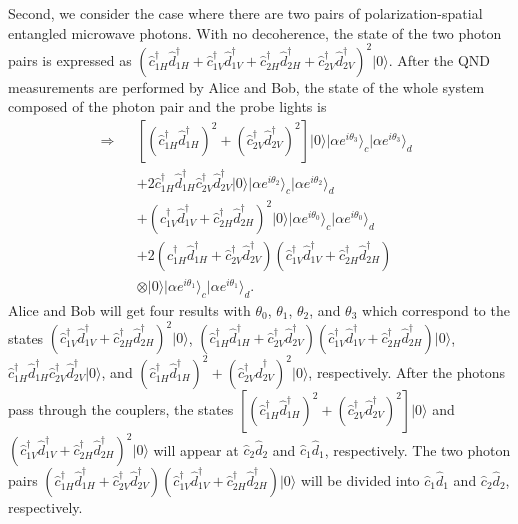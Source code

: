 \documentclass[showpacs,aps,graphicx,twocolumn]{revtex4}
\begin{document}
Second, we consider the case where there are two pairs of
polarization-spatial entangled microwave photons. With no
decoherence, the state of the two photon pairs is expressed as
$(\hat{c}_{1H}^{\dag}\hat{d}_{1H}^{\dag}+\hat{c}_{1V}^{\dag}\hat{d}_{1V}^{\dag}
+\hat{c}_{2H}^{\dag}\hat{d}_{2H}^{\dag}+\hat{c}_{2V}^{\dag}\hat{d}_{2V}^{\dag})^{2}|0\rangle$.
After the QND measurements are performed by Alice and Bob, the state
of the whole system composed of the photon pair and the probe lights
is
\begin{eqnarray}        \label{eq17}
\Longrightarrow\!\!\!\!&&[(\hat{c}_{1H}^{\dag}\hat{d}_{1H}^{\dag})^{2}
+(\hat{c}_{2V}^{\dag}\hat{d}_{2V}^{\dag})^{2}]|0\rangle
|\alpha e^{i\theta_{3}}\rangle_{c}|\alpha e^{i\theta_{3}}\rangle_{d}\nonumber\\
&&+2\hat{c}_{1H}^{\dag}\hat{d}_{1H}^{\dag}\hat{c}_{2V}^{\dag}\hat{d}_{2V}^{\dag}|0\rangle
|\alpha e^{i\theta_{2}}\rangle_{c}|\alpha e^{i\theta_{2}}\rangle_{d}\nonumber\\
&&+(\hat{c}_{1V}^{\dag}\hat{d}_{1V}^{\dag}+\hat{c}_{2H}^{\dag}\hat{d}_{2H}^{\dag})^{2}
|0\rangle|\alpha e^{i\theta_{0}}\rangle_{c}|\alpha e^{i\theta_{0}}\rangle_{d}\nonumber\\
&&+2(\hat{c}_{1H}^{\dag}\hat{d}_{1H}^{\dag}+\hat{c}_{2V}^{\dag}\hat{d}_{2V}^{\dag})
(\hat{c}_{1V}^{\dag}\hat{d}_{1V}^{\dag}+\hat{c}_{2H}^{\dag}\hat{d}_{2H}^{\dag})\;\;\;\;\;\;\;\nonumber\\
&&\otimes|0\rangle|\alpha e^{i\theta_{1}}\rangle_{c}|\alpha
e^{i\theta_{1}}\rangle_{d}.
\end{eqnarray}
Alice and Bob will get four results with $\theta_{0}$,
$\theta_{1}$, $\theta_{2}$, and $\theta_{3}$ which  correspond to the states
$(\hat{c}_{1V}^{\dag}\hat{d}_{1V}^{\dag}+\hat{c}_{2H}^{\dag}\hat{d}_{2H}^{\dag})^{2}|0\rangle$,
$(\hat{c}_{1H}^{\dag}\hat{d}_{1H}^{\dag}+\hat{c}_{2V}^{\dag}\hat{d}_{2V}^{\dag})
(\hat{c}_{1V}^{\dag}\hat{d}_{1V}^{\dag}+\hat{c}_{2H}^{\dag}\hat{d}_{2H}^{\dag})|0\rangle$,
$\hat{c}_{1H}^{\dag}\hat{d}_{1H}^{\dag}\hat{c}_{2V}^{\dag}\hat{d}_{2V}^{\dag}|0\rangle$,
and $(\hat{c}_{1H}^{\dag}\hat{d}_{1H}^{\dag})^{2}+(\hat{c}_{2V}^{\dag}\hat{d}_{2V}^{\dag})^{2}|0\rangle$,
respectively. After the photons pass through the couplers, the states
$[(\hat{c}_{1H}^{\dag}\hat{d}_{1H}^{\dag})^{2}+(\hat{c}_{2V}^{\dag}\hat{d}_{2V}^{\dag})^{2}]|0\rangle$
and
$(\hat{c}_{1V}^{\dag}\hat{d}_{1V}^{\dag}+\hat{c}_{2H}^{\dag}\hat{d}_{2H}^{\dag})^{2}|0\rangle$
will appear at $\hat{c}_{2}\hat{d}_{2}$ and $\hat{c}_{1}\hat{d}_{1}$, respectively.
The two photon pairs
$(\hat{c}_{1H}^{\dag}\hat{d}_{1H}^{\dag}+\hat{c}_{2V}^{\dag}\hat{d}_{2V}^{\dag})
(\hat{c}_{1V}^{\dag}\hat{d}_{1V}^{\dag}+\hat{c}_{2H}^{\dag}\hat{d}_{2H}^{\dag})|0\rangle$
will be divided into $\hat{c}_{1}\hat{d}_{1}$ and
$\hat{c}_{2}\hat{d}_{2}$, respectively.
\end{document}
